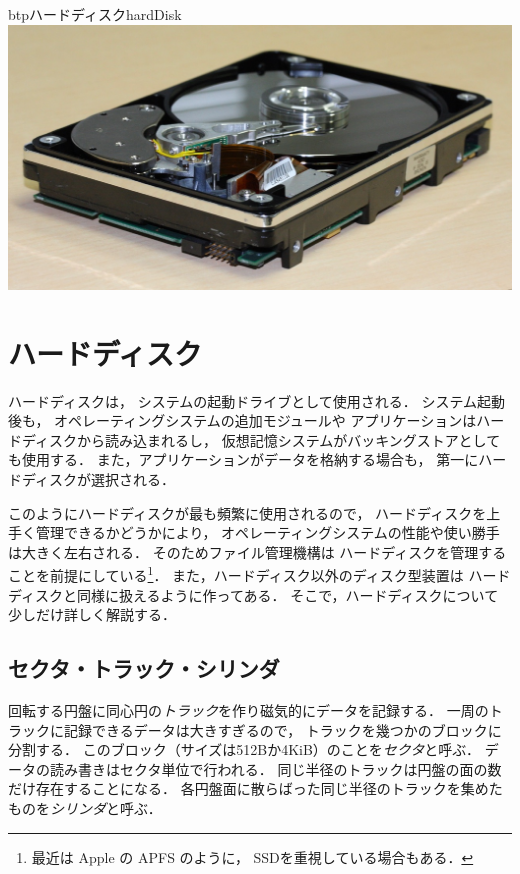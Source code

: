 \begin{enumerate}
  \begin{myfig}{btp}{ハードディスク}{hardDisk}
    \includegraphics[scale=0.3]{Fig/hardDisk.jpg}
  \end{myfig}

\end{enumerate}

\section{ハードディスク}
ハードディスクは，
システムの起動ドライブとして使用される．
システム起動後も，
オペレーティングシステムの追加モジュールや
アプリケーションはハードディスクから読み込まれるし，
仮想記憶システムがバッキングストアとしても使用する．
また，アプリケーションがデータを格納する場合も，
第一にハードディスクが選択される．

このようにハードディスクが最も頻繁に使用されるので，
ハードディスクを上手く管理できるかどうかにより，
オペレーティングシステムの性能や使い勝手は大きく左右される．
そのためファイル管理機構は
ハードディスクを管理することを前提にしている\footnote{
最近は Apple の APFS \cite{appleFileSystem}のように，
SSDを重視している場合もある．}．
また，ハードディスク以外のディスク型装置は
ハードディスクと同様に扱えるように作ってある．
そこで，ハードディスクについて少しだけ詳しく解説する．

\subsection{セクタ・トラック・シリンダ}
回転する円盤に同心円の\emph{トラック}を作り磁気的にデータを記録する．
一周のトラックに記録できるデータは大きすぎるので，
トラックを幾つかのブロックに分割する．
このブロック（サイズは512Bか4KiB）のことを\emph{セクタ}と呼ぶ．
データの読み書きはセクタ単位で行われる．
同じ半径のトラックは円盤の面の数だけ存在することになる．
各円盤面に散らばった同じ半径のトラックを集めたものを\emph{シリンダ}と呼ぶ．

